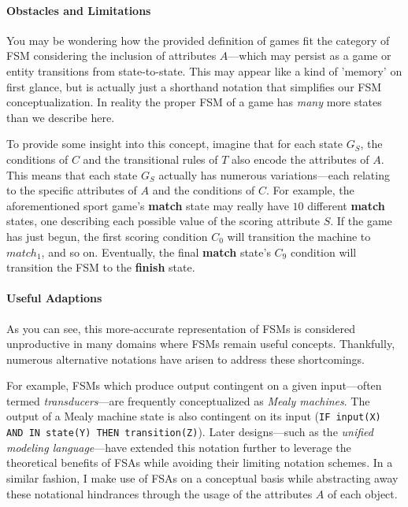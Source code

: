 \documentclass{report}
\newcommand{\state}[1]{\textbf{#1}}
\begin{document}
\paragraph{Obstacles and Limitations}
You may be wondering how the provided definition of games fit the category of FSM considering the inclusion of attributes $A$---which may persist as a game or entity transitions from state-to-state. This may appear like a kind of 'memory' on first glance, but is actually just a shorthand notation that simplifies our FSM conceptualization. In reality the proper FSM of a game has \emph{many} more states than we describe here. 

To provide some insight into this concept, imagine that for each state $G_S$, the conditions of $C$ and the transitional rules of $T$ also encode the attributes of $A$. This means that each state $G_S$ actually has numerous variations---each relating to the specific attributes of $A$ and the conditions of $C$. For example, the aforementioned sport game's \state{match} state may really have $10$ different \state{match} states, one describing each possible value of the scoring attribute $S$. If the game has just begun, the first scoring condition $C_0$ will transition the machine to $match_1$, and so on. Eventually, the final \state{match} state's $C_9$ condition will transition the FSM to the \state{finish} state.


\paragraph{Useful Adaptions}

As you can see, this more-accurate representation of FSMs is considered unproductive in many domains where FSMs remain useful concepts\cite{state}. Thankfully, numerous alternative notations have arisen to address these shortcomings. 

For example, FSMs which produce output contingent on a given input---often termed \emph{transducers}\cite{FSM}---are frequently conceptualized as \emph{Mealy machines}. The output of a Mealy machine state is also contingent on its input (\texttt{IF input(X) AND IN state(Y) THEN transition(Z)}). Later designs---such as the \emph{unified modeling language}---have extended this notation further to leverage the theoretical benefits of FSAs while avoiding their limiting notation schemes\cite{omg2011umls}. In a similar fashion, I make use of FSAs on a conceptual basis while abstracting away these notational hindrances through the usage of the attributes $A$ of each object. 
\end{document}
